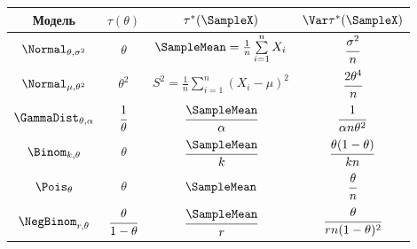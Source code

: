 \begin{mytable}
	\begin{center}
		\caption{Эффективные оценки в регулярных моделях.}
		\begin{tabular}{|c|c|c|c|}
			\hline Модель & $\tau(\theta)$ & $\tau^*(\SampleX)$ & $\Var \tau^*(\SampleX)$\\
			\hline $\Normal_{\theta, \sigma^2}$ & $\theta$ & $\SampleMean = \frac{1}{n} \sum\limits_{i=1}^{n} X_i$ & $\cfrac{\sigma^2}{n}$\\[12pt]
			\hline \mylinespace[7.5pt] $\Normal_{\mu, \theta^2}$ & $\theta^2$ & $S^2 = \frac{1}{n} \sum\limits_{i=1}^{n} \left(X_i - \mu\right)^2$ & $\cfrac{2\theta^4}{n}$\\[12pt]
			\hline \mylinespace[7.5pt] $\GammaDist_{\theta, \alpha}$ & $\cfrac{1}{\theta}$ & $\cfrac{\SampleMean}{\alpha}$ & $\cfrac{1}{\alpha n \theta^2}$\\[12pt]
			\hline \mylinespace[7.5pt] $\Binom_{k, \theta}$ & $\theta$ & $\cfrac{\SampleMean}{k}$ & $\cfrac{\theta(1 - \theta)}{kn}$\\[12pt]
			\hline $\Pois_{\theta}$ & $\theta$ & $\SampleMean$ & $\cfrac{\theta}{n}$\\[12pt]
			\hline \mylinespace[7.5pt] $\NegBinom_{r, \theta}$ & $\cfrac{\theta}{1 - \theta}$ & $\cfrac{\SampleMean}{r}$ & $\cfrac{\theta}{rn(1 - \theta)^2}$\\[12pt]
			\hline
		\end{tabular}
	\end{center}
\end{mytable}
